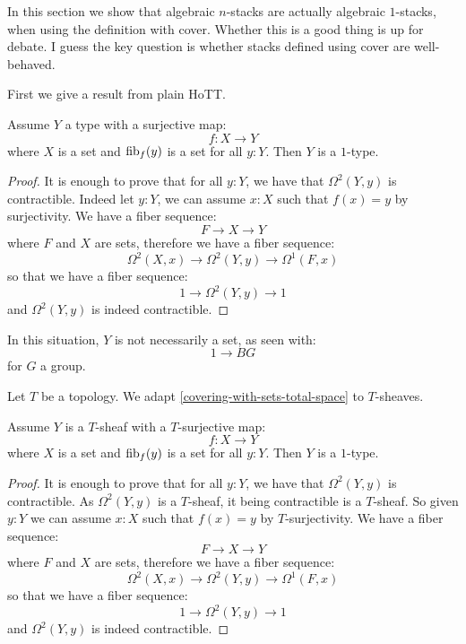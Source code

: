 In this section we show that algebraic $n$-stacks are actually algebraic $1$-stacks, when using the definition with cover. Whether this is a good thing is up for debate. I guess the key question is whether stacks defined using cover are well-behaved.

First we give a result from plain HoTT.

\begin{lemma}\label{covering-with-sets-total-space}
Assume $Y$ a type with a surjective map:
\[f:X\to Y\]
where $X$ is a set and $\mathrm{fib}_f(y)$ is a set for all $y:Y$. Then $Y$ is a $1$-type.
\end{lemma}

\begin{proof}
It is enough to prove that for all $y:Y$, we have that $\Omega^2(Y,y)$ is contractible. Indeed let $y:Y$, we can assume $x:X$ such that $f(x)=y$ by surjectivity. We have a fiber sequence:
\[F\to X\to Y\]
where $F$ and $X$ are sets, therefore we have a fiber sequence:
\[\Omega^2(X,x) \to \Omega^2(Y,y) \to \Omega^1(F,x)\]
so that we have a fiber sequence:
\[1\to \Omega^2(Y,y)\to 1\]
and $\Omega^2(Y,y)$ is indeed contractible.
\end{proof}

\begin{remark}
In this situation, $Y$ is not necessarily a set, as seen with:
\[1\to BG\]
for $G$ a group.
\end{remark}

Let $T$ be a topology. We adapt \cref{covering-with-sets-total-space} to $T$-sheaves.

\begin{lemma}\label{covering-with-sets-total-space-sheaf}
Assume $Y$ is a $T$-sheaf with a $T$-surjective map:
\[f:X\to Y\]
where $X$ is a set and $\mathrm{fib}_f(y)$ is a set for all $y:Y$. Then $Y$ is a $1$-type.
\end{lemma}

\begin{proof}
It is enough to prove that for all $y:Y$, we have that $\Omega^2(Y,y)$ is contractible. As $\Omega^2(Y,y)$ is a $T$-sheaf, it being contractible is a $T$-sheaf. So given $y:Y$ we can assume $x:X$ such that $f(x)=y$ by $T$-surjectivity. We have a fiber sequence:
\[F\to X\to Y\]
where $F$ and $X$ are sets, therefore we have a fiber sequence:
\[\Omega^2(X,x) \to \Omega^2(Y,y) \to \Omega^1(F,x)\]
so that we have a fiber sequence:
\[1\to \Omega^2(Y,y)\to 1\]
and $\Omega^2(Y,y)$ is indeed contractible.
\end{proof}

